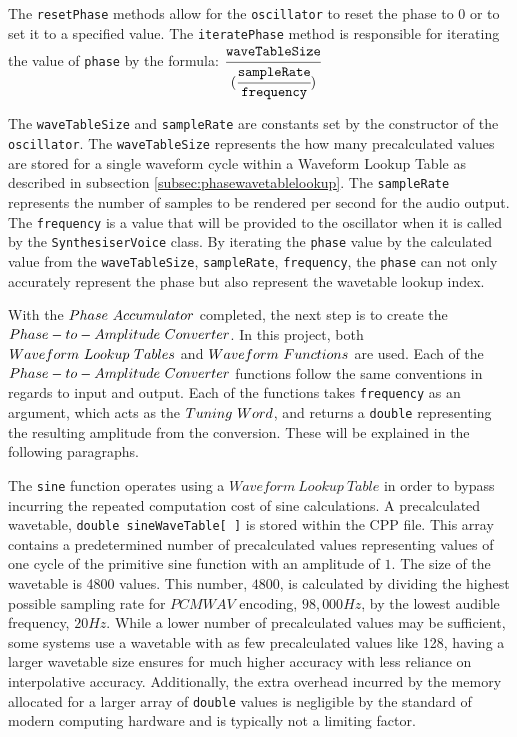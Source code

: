 \documentclass[a4paper,12pt]{report}
\begin{document}
The \texttt{resetPhase} methods allow for the \texttt{oscillator} to reset the phase to $0$ or to set it to a specified value. The \texttt{iteratePhase} method is responsible for iterating the value of \texttt{phase} by the formula: \begin{math}
\cfrac{\texttt{waveTableSize}}{(\cfrac{\texttt{sampleRate}}{\texttt{frequency}})}
\end{math}

The \texttt{wave\-Table\-Size} and \texttt{sample\-Rate} are constants set by the constructor of the \texttt{oscillator}. The \texttt{wave\-Table\-Size} represents the how many precalculated values are stored for a single waveform cycle within a Waveform Lookup Table as described in subsection \ref{subsec:phasewavetablelookup}. The \texttt{sample\-Rate} represents the number of samples to be rendered per second for the audio output. The \texttt{frequency} is a value that will be provided to the oscillator when it is called by the \texttt{Synthesiser\-Voice} class. By iterating the \texttt{phase} value by the calculated value from the \texttt{wave\-Table\-Size}, \texttt{sample\-Rate}, \texttt{frequency}, the \texttt{phase} can not only accurately represent the phase but also represent the wavetable lookup index.

With the $Phase\ \-Accumulator$ completed, the next step is to create the $Phase-to-Amplitude\ \-Converter$. In this project, both $Waveform\ \-Lookup\ \-Tables$ and $Waveform\ \-Functions$ are used. Each of the $Phase-to-Amplitude\ \-Converter$ functions follow the same conventions in regards to input and output. Each of the functions takes \texttt{frequency} as an argument, which acts as the $Tuning\ \-Word$, and returns a \texttt{double} representing the resulting amplitude from the conversion. These will be explained in the following paragraphs.

The \texttt{sine} function operates using a $Waveform\ Lookup\ Table$ in order to bypass incurring the repeated computation cost of sine calculations. A precalculated wavetable, \texttt{double sine\-Wave\-Table[ ]} is stored within the CPP file. This array contains a predetermined number of precalculated values representing values of one cycle of the primitive sine function with an amplitude of $1$. The size of the wavetable is 4800 values. This number, $4800$, is calculated by dividing the highest possible sampling rate for $PCM WAV$ encoding, $98,000Hz$, by the lowest audible frequency, $20Hz$. While a lower number of precalculated values may be sufficient, some systems use a wavetable with as few precalculated values like 128, having a larger wavetable size ensures for much higher accuracy with less reliance on interpolative accuracy. Additionally, the extra overhead incurred by the memory allocated for a larger array of \texttt{double} values is negligible by the standard of modern computing hardware and is typically not a limiting factor.
\end{document}
